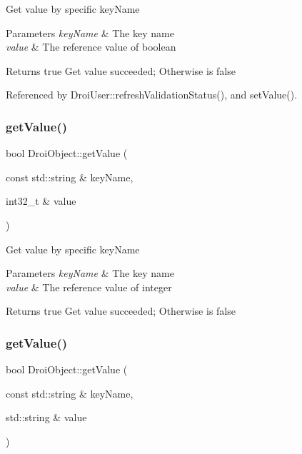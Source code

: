Get value by specific key\+Name 
\begin{DoxyParams}{Parameters}
{\em key\+Name} & The key name \\
\hline
{\em value} & The reference value of boolean \\
\hline
\end{DoxyParams}
\begin{DoxyReturn}{Returns}
true Get value succeeded; Otherwise is false 
\end{DoxyReturn}


Referenced by Droi\+User\+::refresh\+Validation\+Status(), and set\+Value().

\mbox{\label{class_droi_object_a2a0204825653dca43d68baefcbecf92a}} 
\subsubsection{\texorpdfstring{get\+Value()}{getValue()}\hspace{0.1cm}{\footnotesize\ttfamily [2/11]}}
{\footnotesize\ttfamily bool Droi\+Object\+::get\+Value (\begin{DoxyParamCaption}\item[{const std\+::string \&}]{key\+Name,  }\item[{int32\+\_\+t \&}]{value }\end{DoxyParamCaption})}

Get value by specific key\+Name 
\begin{DoxyParams}{Parameters}
{\em key\+Name} & The key name \\
\hline
{\em value} & The reference value of integer \\
\hline
\end{DoxyParams}
\begin{DoxyReturn}{Returns}
true Get value succeeded; Otherwise is false 
\end{DoxyReturn}
\mbox{\label{class_droi_object_a71107e93cc5da4658950274775bdeb22}} 
\subsubsection{\texorpdfstring{get\+Value()}{getValue()}\hspace{0.1cm}{\footnotesize\ttfamily [3/11]}}
{\footnotesize\ttfamily bool Droi\+Object\+::get\+Value (\begin{DoxyParamCaption}\item[{const std\+::string \&}]{key\+Name,  }\item[{std\+::string \&}]{value }\end{DoxyParamCaption})}

